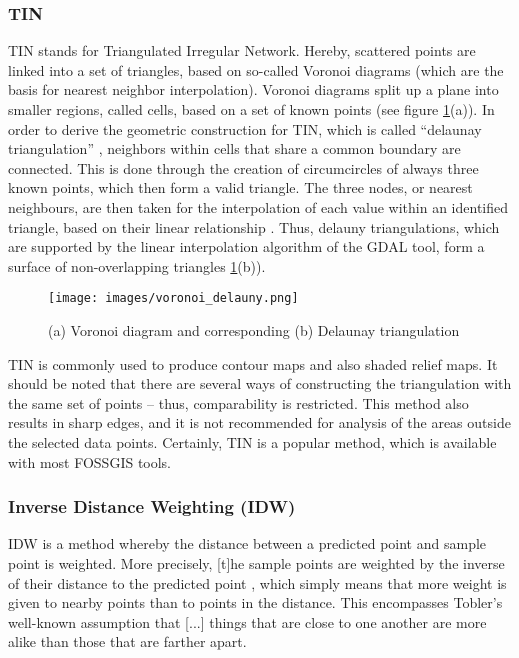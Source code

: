\subsubsection{TIN}

TIN stands for \ldq{}Triangulated Irregular Network\rdq{}. Hereby, scattered points are linked into a set of triangles, based on so-called Voronoi diagrams (which are the basis for nearest neighbor interpolation). Voronoi diagrams split up a plane into smaller regions, called cells, based on a set of known points (see figure \ref{fig:voronoi_delauny}(a)). In order to derive the geometric construction for TIN, which is called “delaunay triangulation” \cite{sambridge_geophysical_1995}, neighbors within cells that share a common boundary are connected. This is done through the creation of circumcircles of always three known points, which then form a valid triangle. The three nodes, or nearest neighbours, are then taken for the interpolation of each value within an identified triangle, based on their linear relationship \cite{lam_spatial_2009}. Thus, delauny triangulations, which are supported by the linear interpolation algorithm of the GDAL tool, form a surface of non-overlapping triangles \ref{fig:voronoi_delauny}(b)). 


\begin{figure}
	\texttt{[image: images/voronoi\_delauny.png]}
	\caption{(a) Voronoi diagram and corresponding (b) Delaunay triangulation\cite{sambridge_geophysical_1995}}
	\label{fig:voronoi_delauny}
\end{figure}

TIN is commonly used to produce contour maps and also shaded relief maps. \cite{lam_spatial_2009}
It should be noted that there are several ways of constructing the triangulation with the same set of points – thus, comparability is restricted. This method also results in sharp edges, and it is not recommended for analysis of the areas outside the selected data points. \cite{qgis_11_2021} Certainly, TIN is a popular method, which is available with most FOSSGIS tools. 

\subsubsection{Inverse Distance Weighting (IDW)}
IDW is a method whereby the distance between a predicted point and sample point is weighted. More precisely, \ldq{}[t]he sample points are weighted by the inverse of their distance to the predicted point\rdq{} \cite[p.2]{wenjing_cao_study_2009}, which simply means that more weight is given to nearby points than to points in the distance. \cite{lam_spatial_2009} This encompasses Tobler’s well-known assumption that \ldq{}[...] things that are close to one another are more alike than those that are farther apart\rdq{}. \cite{samanta_interpolation_2012}

